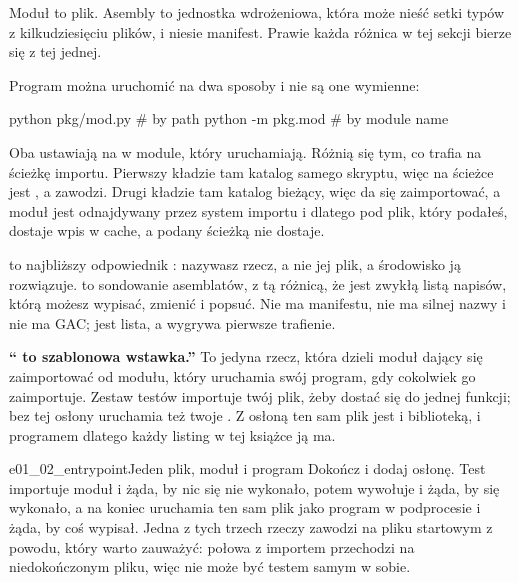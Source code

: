\noindent
Moduł to plik. Asembly to jednostka wdrożeniowa, która może nieść setki typów
z kilkudziesięciu plików, i niesie manifest. Prawie każda różnica w tej
sekcji bierze się z tej jednej.

Program można uruchomić na dwa sposoby i nie są one wymienne:

\begin{shellcmd}
python pkg/mod.py     # by path
python -m pkg.mod     # by module name
\end{shellcmd}

\noindent
Oba ustawiają  na  w module, który
uruchamiają. Różnią się tym, co trafia na ścieżkę importu. Pierwszy kładzie
tam katalog samego skryptu, więc na ścieżce jest , a
 zawodzi. Drugi kładzie tam katalog bieżący, więc
 da się zaimportować, a moduł jest odnajdywany przez system
importu \dash{} i dlatego pod  plik, który podałeś, dostaje wpis w
cache, a podany ścieżką nie dostaje.

\begin{csbox}
 to najbliższy odpowiednik :
nazywasz rzecz, a nie jej plik, a środowisko ją rozwiązuje. 
to sondowanie asemblatów, z tą różnicą, że jest zwykłą listą napisów, którą
możesz wypisać, zmienić i popsuć. Nie ma manifestu, nie ma silnej nazwy i nie
ma GAC; jest lista, a wygrywa pierwsze trafienie.
\end{csbox}

\begin{trapbox}
\textbf{\enquote{ to szablonowa
wstawka.}} To jedyna rzecz, która dzieli moduł dający się zaimportować od
modułu, który uruchamia swój program, gdy cokolwiek go zaimportuje. Zestaw
testów importuje twój plik, żeby dostać się do jednej funkcji; bez tej osłony
uruchamia też twoje . Z osłoną ten sam plik jest i biblioteką, i
programem \dash{} dlatego każdy listing w tej książce ją ma.
\end{trapbox}

\begin{exercise}{e01_02_entrypoint}{Jeden plik, moduł i program}
Dokończ  i dodaj osłonę. Test importuje moduł i żąda, by nic się
nie wykonało, potem wywołuje  i żąda, by się wykonało, a na koniec
uruchamia ten sam plik jako program w podprocesie i żąda, by coś wypisał.
Jedna z tych trzech rzeczy zawodzi na pliku startowym z powodu, który warto
zauważyć: połowa z importem przechodzi na niedokończonym pliku, więc nie może
być testem samym w sobie.
\end{exercise}

